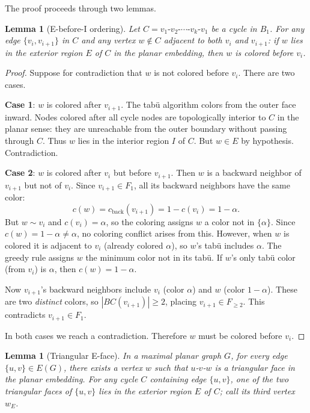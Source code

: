 \documentclass[12pt,letterpaper]{article}
\theoremstyle{plain}
\newtheorem{lemma}[theorem]{Lemma}
\theoremstyle{definition}
\theoremstyle{remark}
\begin{document}
The proof proceeds through two lemmas.

\begin{lemma}[E-before-I ordering]
\label{lem:ebeforei}
Let $C = v_1\text{-}v_2\text{-}\cdots\text{-}v_k\text{-}v_1$ be a cycle in
$B_1$. For any edge $\{v_i, v_{i+1}\}$ in $C$ and any vertex $w \notin C$
adjacent to both $v_i$ and $v_{i+1}$: if $w$ lies in the exterior region $E$
of $C$ in the planar embedding, then $w$ is colored before $v_i$.
\end{lemma}

\begin{proof}
Suppose for contradiction that $w$ is not colored before $v_i$. There are two
cases.

\textbf{Case 1}: $w$ is colored after $v_{i+1}$.
The tab\"{u} algorithm colors from the outer face inward. Nodes colored after
all cycle nodes are topologically interior to $C$ in the planar sense: they are
unreachable from the outer boundary without passing through $C$. Thus $w$ lies
in the interior region $I$ of $C$. But $w \in E$ by hypothesis. Contradiction.

\textbf{Case 2}: $w$ is colored after $v_i$ but before $v_{i+1}$.
Then $w$ is a backward neighbor of $v_{i+1}$ but not of $v_i$.
Since $v_{i+1} \in F_1$, all its backward neighbors have the same color:
\[
    c(w) = c_{\mathrm{back}}(v_{i+1}) = 1 - c(v_i) = 1-\alpha.
\]
But $w \sim v_i$ and $c(v_i) = \alpha$, so the coloring assigns $w$ a color
not in $\{\alpha\}$. Since $c(w) = 1-\alpha \neq \alpha$, no coloring conflict
arises from this. However, when $w$ is colored it is adjacent to $v_i$ (already
colored $\alpha$), so $w$'s tab\"{u} includes $\alpha$. The greedy rule assigns
$w$ the minimum color not in its tab\"{u}. If $w$'s only tab\"{u} color (from
$v_i$) is $\alpha$, then $c(w) = 1-\alpha$.

Now $v_{i+1}$'s backward neighbors include $v_i$ (color $\alpha$) and $w$
(color $1-\alpha$). These are two \emph{distinct} colors, so $|BC(v_{i+1})| \geq 2$,
placing $v_{i+1} \in F_{\geq 2}$. This contradicts $v_{i+1} \in F_1$.

In both cases we reach a contradiction. Therefore $w$ must be colored before
$v_i$.
\end{proof}

\begin{lemma}[Triangular E-face]
\label{lem:triface}
In a maximal planar graph $G$, for every edge $\{u, v\} \in E(G)$, there
exists a vertex $w$ such that $u$-$v$-$w$ is a triangular face in the planar
embedding. For any cycle $C$ containing edge $\{u,v\}$, one of the two
triangular faces of $\{u,v\}$ lies in the exterior region $E$ of $C$; call
its third vertex $w_E$.
\end{lemma}
\end{document}
